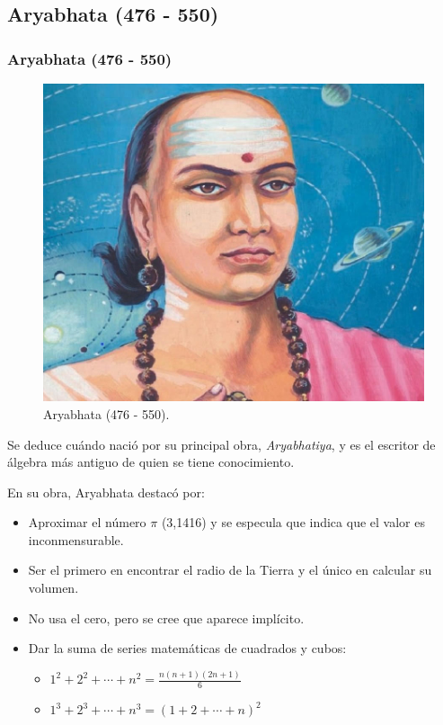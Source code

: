 \documentclass[compress, aspectratio=169]{beamer} %
\begin{document}
	\subsection{Aryabhata (476 - 550)}
		\begin{frame}
			\frametitle{Aryabhata (476 - 550)}
			\begin{figure}
				\centering
				\includegraphics[width = .4\linewidth]{aryabhata.jpg}
				\caption{Aryabhata (476 - 550).}
			\end{figure}
		\end{frame}
		
		\begin{frame}
			Se deduce cuándo nació por su principal obra, \textit{Aryabhatiya}, y es el escritor de álgebra más antiguo
			de quien se tiene conocimiento.
			
			En su obra, Aryabhata destacó por:
			\begin{itemize}
				\item Aproximar el número $\pi$ (3,1416) y se especula que indica que el valor es inconmensurable.
				\item Ser el primero en encontrar el radio de la Tierra y el único en calcular su volumen.
				\item No usa el cero, pero se cree que aparece implícito.					
				\item Dar la suma de series matemáticas de cuadrados y cubos:
				\begin{itemize}
					\item $\displaystyle 1^2 + 2^2 + \cdots + n^2 = \frac{n(n + 1)(2n + 1)}{6}$
					\item $\displaystyle 1^{3} + 2^{3} + \cdots + n^{3} = (1+2+\cdots +n)^{2}$ 
				\end{itemize}
			\end{itemize}			
		\end{frame}
			
\end{document}
